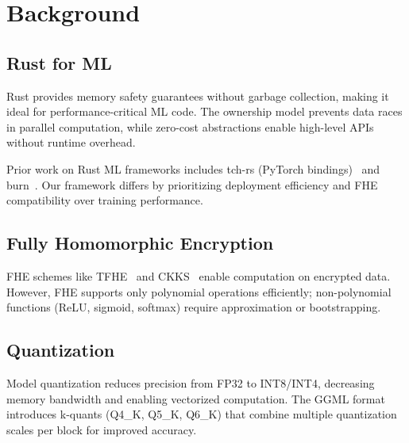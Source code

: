 \section{Background}


\subsection{Rust for ML}

Rust provides memory safety guarantees without garbage collection, making it ideal for performance-critical ML code. The ownership model prevents data races in parallel computation, while zero-cost abstractions enable high-level APIs without runtime overhead.

Prior work on Rust ML frameworks includes tch-rs (PyTorch bindings)~\cite{tchrs2020} and burn~\cite{burn2023}. Our framework differs by prioritizing deployment efficiency and FHE compatibility over training performance.

\subsection{Fully Homomorphic Encryption}

FHE schemes like TFHE~\cite{tfhe2016} and CKKS~\cite{ckks2017} enable computation on encrypted data. However, FHE supports only polynomial operations efficiently; non-polynomial functions (ReLU, sigmoid, softmax) require approximation or bootstrapping.

\subsection{Quantization}

Model quantization reduces precision from FP32 to INT8/INT4, decreasing memory bandwidth and enabling vectorized computation. The GGML format~\cite{ggml2023} introduces k-quants (Q4\_K, Q5\_K, Q6\_K) that combine multiple quantization scales per block for improved accuracy.

